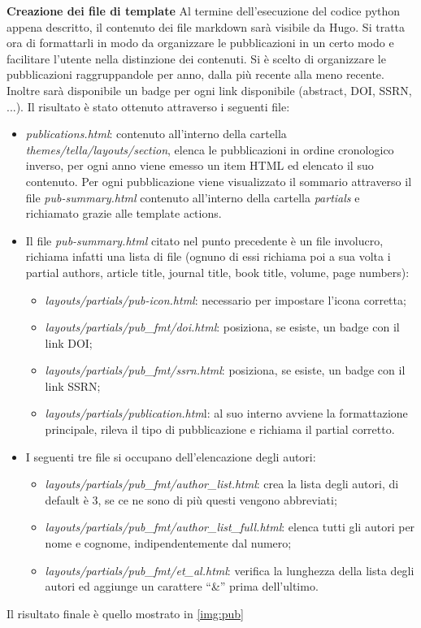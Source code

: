 \documentclass[target=bach,aauheader=]{thud}
\begin{document}
\textbf{{\fontsize{12}{14}\selectfont Creazione dei file di template}}
\newline \newline
Al termine dell'esecuzione del codice python appena descritto, il contenuto dei file markdown sarà visibile da Hugo. Si tratta ora di formattarli in modo da organizzare le pubblicazioni in un certo modo e facilitare l'utente nella distinzione dei contenuti.
\newline
Si è scelto di organizzare le pubblicazioni raggruppandole per anno, dalla più recente alla meno recente. Inoltre sarà disponibile un badge per ogni link disponibile (abstract, DOI, SSRN, ...). Il risultato è stato ottenuto attraverso i seguenti file:
\begin{itemize}
    \item \textit{publications.html}: contenuto all'interno della cartella \textit{themes/tella/layouts/section}, elenca le pubblicazioni in ordine cronologico inverso, per ogni anno viene emesso un item HTML ed elencato il suo contenuto. 
    \newline
    Per ogni pubblicazione viene visualizzato il sommario attraverso il file \textit{pub-summary.html} contenuto all'interno della cartella \textit{partials} e richiamato grazie alle template actions.
    \item Il file \textit{pub-summary.html} citato nel punto precedente è un file involucro, richiama infatti una lista di file (ognuno di essi richiama poi a sua volta i partial authors, article title, journal title, book title, volume, page numbers):
    \begin{itemize}
        \item \textit{layouts/partials/pub-icon.html}: necessario per impostare l'icona corretta;
        \item \textit{layouts/partials/pub\_fmt/doi.html}: posiziona, se esiste, un badge con il link DOI;
        \item \textit{layouts/partials/pub\_fmt/ssrn.html}: posiziona, se esiste, un badge con il link SSRN;
        \item \textit{layouts/partials/publication.htm}l: al suo interno avviene la formattazione principale, rileva il tipo di pubblicazione e richiama il partial corretto.
    \end{itemize}
    \item I seguenti tre file si occupano dell'elencazione degli autori: 
    \begin{itemize}
        \item \textit{layouts/partials/pub\_fmt/author\_list.html}: crea la lista degli autori, di default è 3, se ce ne sono di più questi vengono abbreviati;
        \item \textit{layouts/partials/pub\_fmt/author\_list\_full.html}: elenca tutti gli autori per nome e cognome, indipendentemente dal numero;
        \item \textit{layouts/partials/pub\_fmt/et\_al.html}: verifica la lunghezza della lista degli autori ed aggiunge un carattere “\&” prima dell'ultimo.
    \end{itemize}
\end{itemize}
Il risultato finale è quello mostrato in \cref{img:pub}
\end{document}
